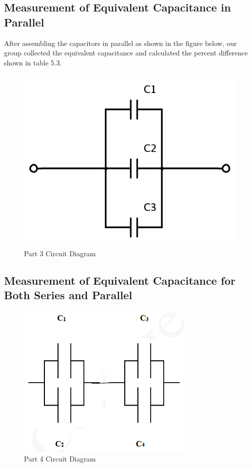\documentclass[titlepage]{article}
\begin{document}
        \subsection{Measurement of Equivalent Capacitance in Parallel}
        After assembling the capacitors in parallel as shown in the figure below, our group collected the equivalent capacitance and calculated the percent difference shown in table 5.3.

        \begin{figure}[hbt!] 
            \centering
            \caption*{Part 3 Circuit Diagram}
            \includegraphics[scale=0.5]{images/procedure/part3.png}
        \end{figure} 



        \FloatBarrier
        \subsection{Measurement of Equivalent Capacitance for Both Series and Parallel}

        \begin{figure}[hbt!] 
            \centering
            \caption*{Part 4 Circuit Diagram}
            \includegraphics[scale=0.5]{images/procedure/part4.png}
        \end{figure} 
\end{document}
